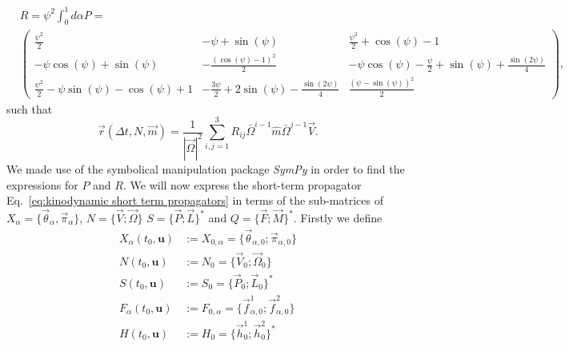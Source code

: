 \documentclass[]{cam-thesis}
\begin{document}
\begin{equation} \label{eq:geometric integrator R matrix}
\begin{aligned}
	& R = \psi^2 \int_0^1 d\alpha P =  \\
	& \begin{pmatrix}
\frac{\psi^{2}}{2} & - \psi + \sin{\left(\psi \right)} & \frac{\psi^{2}}{2} + \cos{\left(\psi \right)} - 1\\
- \psi \cos{\left(\psi \right)} + \sin{\left(\psi \right)} & - \frac{\left(\cos{\left(\psi \right)} - 1\right)^{2}}{2} &
 - \psi \cos{\left(\psi \right)} - \frac{\psi}{2} 
 + \sin{\left(\psi \right)} + \frac{\sin{\left(2 \psi \right)}}{4}  \\
\frac{\psi^{2}}{2} - \psi \sin{\left(\psi \right)} - \cos{\left(\psi \right)} + 1 & - \frac{3 \psi}{2} + 2 \sin{\left(\psi \right)} - \frac{\sin{\left(2 \psi \right)}}{4} & \frac{\left(\psi - \sin{\left(\psi \right)}\right)^{2}}{2}
	\end{pmatrix},
\end{aligned}
\end{equation}
\normalsize
such that
\begin{equation} \label{eq:r function SE(3)}
	\vec{r}(\Delta t, N, \vec{m}) = \frac{1}{|\vec{\Omega}|^2} \sum_{i,j=1}^{3} R_{ij} \bar{\Omega}^{i-1} \hat{m} \bar{\Omega}^{j-1} \vec{V}.
\end{equation}
We made use of the symbolical manipulation package \emph{SymPy} \citep{meurerSymPySymbolicComputing2017} in order to find the expressions for $P$ and $R$. We will now express the short-term propagator Eq.~\ref{eq:kinodynamic short term propagators} in terms of the sub-matrices of $X_\alpha = \{ \vec{\theta}_\alpha, \vec{\pi}_\alpha \}$, $N = \{ \vec{V} ; \vec{\Omega} \}$ $S = \{ \vec{P} ; \vec{L} \}^*$ and $Q = \{ \vec{F} ; \vec{M} \}^*$. Firstly we define
\begin{subequations}
	\begin{align}
		X_\alpha(t_0, \mathbf{u}) & := X_{0,\alpha} = \{ \vec{\theta}_{\alpha,0} ; \vec{\pi}_{\alpha,0} \} \\
		N(t_0, \mathbf{u}) & := N_0 = \{ \vec{V}_0 ; \vec{\Omega}_0 \} \\
		S(t_0, \mathbf{u}) & := S_0 = \{ \vec{P}_0 ; \vec{L}_0 \}^* \\
		F_\alpha(t_0, \mathbf{u}) & := F_{0,\alpha} = \{ \vec{f}^1_{\alpha,0} ; \vec{f}^2_{\alpha,0} \} \\
		H(t_0, \mathbf{u}) & := H_0 = \{ \vec{h}^1_0 ; \vec{h}^2_0 \}^*
	\end{align}
\end{subequations}
\end{document}
